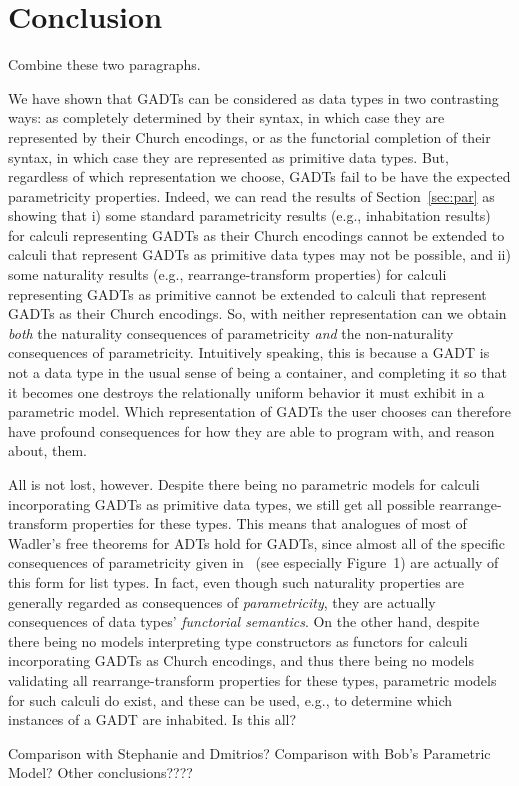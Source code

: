 \documentclass[acmsmall,screen,review,anonymous]{acmart}
\theoremstyle{definition}
\begin{document}
\section{Conclusion}

{\color{blue} Combine these two paragraphs.}

We have shown that GADTs can be considered as data types in two
contrasting ways: as completely determined by their syntax, in which
case they are represented by their Church encodings, or as the
functorial completion of their syntax, in which case they are
represented as primitive data types.  But, regardless of which
representation we choose, GADTs fail to be have the expected
parametricity properties. Indeed, we can read the results of
Section~\ref{sec:par} as showing that i) some standard parametricity
results (e.g., inhabitation results) for calculi representing GADTs as
their Church encodings cannot be extended to calculi that represent
GADTs as primitive data types may not be possible, and ii) some
naturality results (e.g., rearrange-transform properties) for calculi
representing GADTs as primitive cannot be extended to calculi that
represent GADTs as their Church encodings. So, with neither
representation can we obtain {\em both} the naturality consequences of
parametricity {\em and} the non-naturality consequences of
parametricity. Intuitively speaking, this is because a GADT is not a
data type in the usual sense of being a container, and completing it
so that it becomes one destroys the relationally uniform behavior it
must exhibit in a parametric model. Which representation of GADTs the
user chooses can therefore have profound consequences for how they are
able to program with, and reason about, them.

All is not lost, however. Despite there being no parametric models for
calculi incorporating GADTs as primitive data types, we still get all
possible rearrange-transform properties for these types. This means
that analogues of most of Wadler's free theorems for ADTs hold for
GADTs, since almost all of the specific consequences of parametricity
given in~\cite{wad89} (see especially Figure~1) are actually of this
form for list types. In fact, even though such naturality properties
are generally regarded as consequences of {\em parametricity}, they
are actually consequences of data types' {\em functorial semantics}.
On the other hand, despite there being no models interpreting type
constructors as functors for calculi incorporating GADTs as Church
encodings, and thus there being no models validating all
rearrange-transform properties for these types, parametric models for
such calculi do exist, and these can be used, e.g., to determine which
instances of a GADT are inhabited. {\color{blue} Is this all?}

{\color{blue} Comparison with Stephanie and Dmitrios? Comparison with
  Bob's Parametric Model? Other conclusions????} 


\end{document}
